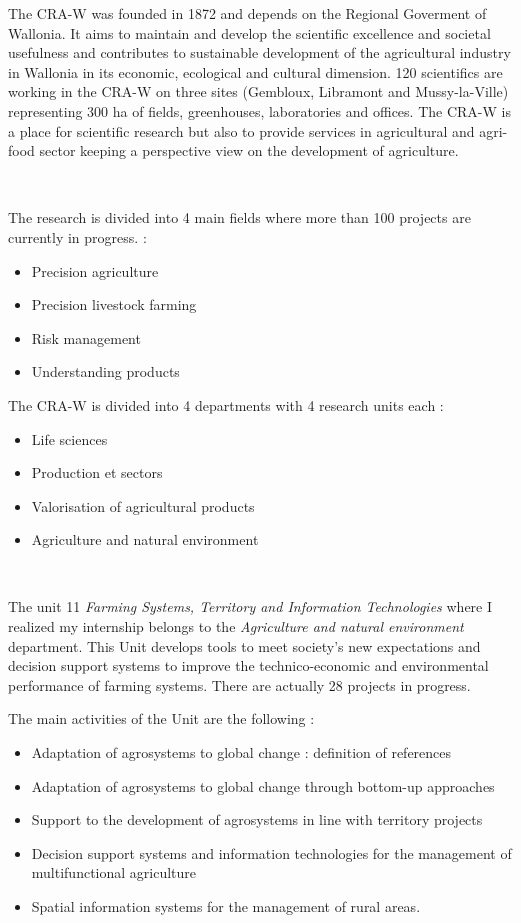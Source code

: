 \documentclass[12pt,twoside]{reedthesis}
\providecommand{\tightlist}{%
  \setlength{\itemsep}{0pt}\setlength{\parskip}{0pt}}
\theoremstyle{definition}
\theoremstyle{definition}
\theoremstyle{definition}
\theoremstyle{remark}
\begin{document}
The CRA-W was founded in 1872 and depends on the Regional Goverment of
Wallonia. It aims to maintain and develop the scientific excellence and
societal usefulness and contributes to sustainable development of the
agricultural industry in Wallonia in its economic, ecological and
cultural dimension. 120 scientifics are working in the CRA-W on three
sites (Gembloux, Libramont and Mussy-la-Ville) representing 300 ha of
fields, greenhouses, laboratories and offices. The CRA-W is a place for
scientific research but also to provide services in agricultural and
agri-food sector keeping a perspective view on the development of
agriculture.

~

The research is divided into 4 main fields where more than 100 projects
are currently in progress. :
\begin{itemize}
\tightlist
\item
  Precision agriculture
\item
  Precision livestock farming
\item
  Risk management
\item
  Understanding products
\end{itemize}
The CRA-W is divided into 4 departments with 4 research units each :
\begin{itemize}
\tightlist
\item
  Life sciences
\item
  Production et sectors
\item
  Valorisation of agricultural products
\item
  Agriculture and natural environment
\end{itemize}
~

The unit 11 \emph{Farming Systems, Territory and Information
Technologies} where I realized my internship belongs to the
\emph{Agriculture and natural environment} department. This Unit
develops tools to meet society's new expectations and decision support
systems to improve the technico-economic and environmental performance
of farming systems. There are actually 28 projects in progress.

The main activities of the Unit are the following :
\begin{itemize}
\tightlist
\item
  Adaptation of agrosystems to global change : definition of references
\item
  Adaptation of agrosystems to global change through bottom-up
  approaches
\item
  Support to the development of agrosystems in line with territory
  projects
\item
  Decision support systems and information technologies for the
  management of multifunctional agriculture
\item
  Spatial information systems for the management of rural areas.
\end{itemize}
~
\end{document}

